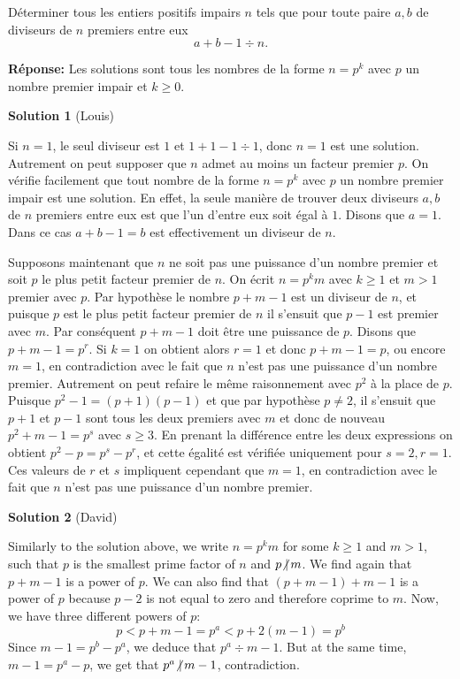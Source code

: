 Déterminer tous les entiers positifs impairs $n$ tels que pour toute paire $a,b$ de diviseurs de $n$ premiers entre eux
\[
a+b-1\div n.
\]

\textbf{Réponse:} Les solutions sont tous les nombres de la forme $n = p^k$ avec $p$ un nombre premier impair et $k\geq 0$.

\textbf{Solution 1} (Louis)

Si $n = 1$, le seul diviseur est $1$ et $1+1-1\div 1$, donc $n=1$ est une solution. Autrement on peut supposer que $n$ admet au moins un facteur premier $p$.
On vérifie facilement que tout nombre de la forme $n = p^k$ avec $p$ un nombre premier impair est une solution. En effet, la seule manière de trouver deux diviseurs $a, b$ de $n$ premiers entre eux est que l'un d'entre eux soit égal à $1$. Disons que $a=1$. Dans ce cas $a+b-1 = b$ est effectivement un diviseur de $n$.

Supposons maintenant que $n$ ne soit pas une puissance d'un nombre premier et soit $p$ le plus petit facteur premier de $n$. On écrit $n = p^k m$ avec $k\geq 1$ et $m>1$ premier avec $p$. Par hypothèse le nombre $p+m-1$ est un diviseur de $n$, et puisque $p$ est le plus petit facteur premier de $n$ il s'ensuit que $p-1$ est premier avec $m$. Par conséquent $p+m-1$ doit être une puissance de $p$. Disons que $p+m-1 = p^r$. Si $k = 1$ on obtient alors $r = 1$ et donc $p+m-1 = p$, ou encore $m=1$, en contradiction avec le fait que $n$ n'est pas une puissance d'un nombre premier. Autrement on peut refaire le même raisonnement avec $p^2$ à la place de $p$. Puisque $p^2-1 = (p+1)(p-1)$ et que par hypothèse $p\neq 2$, il s'ensuit que $p+1$ et $p-1$ sont tous les deux premiers avec $m$ et donc de nouveau $p^2 + m - 1 = p^s$ avec $s\geq 3$. En prenant la différence entre les deux expressions on obtient $p^2 - p = p^s - p^r$, et cette égalité est vérifiée uniquement pour $s=2, r=1$. Ces valeurs de $r$ et $s$ impliquent cependant que $m=1$, en contradiction avec le fait que $n$ n'est pas une puissance d'un nombre premier.


\textbf{Solution 2} (David)

Similarly to the solution above, we write $n=p^k m$ for some $k \geq 1$ and $m>1$, such that $p$ is the smallest prime factor of $n$ and $p \ndiv m$. We find again that $p+m-1$ is a power of $p$. We can also find that $(p+m-1) + m - 1$ is a power of $p$ because $p-2$ is not equal to zero and therefore coprime to $m$. Now, we have three different powers of $p$:
\[
p < p+m-1=p^a < p+2(m-1)=p^b
\]
Since $m-1 = p^b - p^a$, we deduce that $p^a \div m-1$. But at the same time, $m-1 = p^a - p$, we get that $p^a \ndiv m-1$, contradiction.


